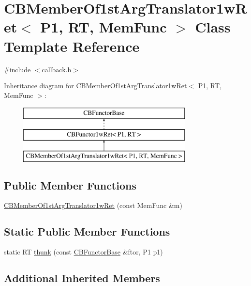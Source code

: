 \hypertarget{class_c_b_member_of1st_arg_translator1w_ret}{\section{C\+B\+Member\+Of1st\+Arg\+Translator1w\+Ret$<$ P1, R\+T, Mem\+Func $>$ Class Template Reference}
\label{class_c_b_member_of1st_arg_translator1w_ret}
}


{\ttfamily \#include $<$callback.\+h$>$}

Inheritance diagram for C\+B\+Member\+Of1st\+Arg\+Translator1w\+Ret$<$ P1, R\+T, Mem\+Func $>$\+:\begin{figure}[H]
\begin{center}
\leavevmode
\includegraphics[height=3.000000cm]{class_c_b_member_of1st_arg_translator1w_ret}
\end{center}
\end{figure}
\subsection*{Public Member Functions}
\begin{DoxyCompactItemize}
\item 
\hyperlink{class_c_b_member_of1st_arg_translator1w_ret_a6caa8b74e38357ffe68b38662fc97731}{C\+B\+Member\+Of1st\+Arg\+Translator1w\+Ret} (const Mem\+Func \&m)
\end{DoxyCompactItemize}
\subsection*{Static Public Member Functions}
\begin{DoxyCompactItemize}
\item 
static R\+T \hyperlink{class_c_b_member_of1st_arg_translator1w_ret_ab4fcb6d97e3ff9f87f0348822b3926d5}{thunk} (const \hyperlink{class_c_b_functor_base}{C\+B\+Functor\+Base} \&ftor, P1 p1)
\end{DoxyCompactItemize}
\subsection*{Additional Inherited Members}


